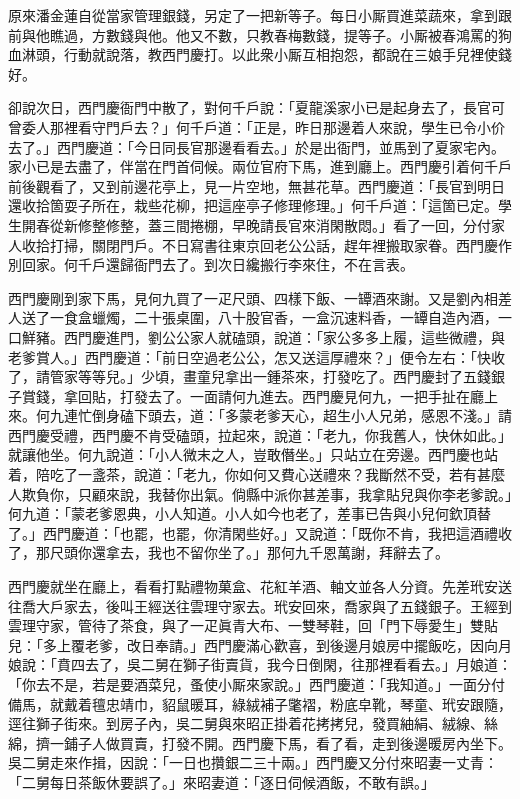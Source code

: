 原來潘金蓮自從當家管理銀錢，另定了一把新等子。每日小厮買進菜蔬來，拿到跟前與他瞧過，方數錢與他。{}他又不數，只教春梅數錢，提等子。小厮被春鴻罵的狗血淋頭，行動就說落，教西門慶打。以此衆小厮互相抱怨，都說在三娘手兒裡使錢好。

卻說次日，西門慶衙門中散了，對何千戶說：「夏龍溪家小已是起身去了，長官可曾委人那裡看守門戶去？」何千戶道：「正是，昨日那邊着人來說，學生已令小价去了。」西門慶道：「今日同長官那邊看看去。」於是出衙門，並馬到了夏家宅內。家小已是去盡了，伴當在門首伺候。兩位官府下馬，進到廳上。西門慶引着何千戶前後觀看了，又到前邊花亭上，見一片空地，無甚花草。西門慶道：「長官到明日還收拾箇耍子所在，栽些花柳，把這座亭子修理修理。」何千戶道：「這箇已定。學生開春從新修整修整，蓋三間捲棚，早晚請長官來消閑散悶。」看了一回，分付家人收拾打掃，關閉門戶。不日寫書往東京回老公公話，趕年裡搬取家眷。西門慶作別回家。何千戶還歸衙門去了。到次日纔搬行李來住，不在言表。

西門慶剛到家下馬，見何九買了一疋尺頭、四樣下飯、一罈酒來謝。又是劉內相差人送了一食盒蠟燭，二十張桌圍，八十股官香，一盒沉速料香，一罈自造內酒，一口鮮豬。西門慶進門，劉公公家人就磕頭，說道：「家公多多上履，這些微禮，與老爹賞人。」西門慶道：「前日空過老公公，怎又送這厚禮來？」便令左右：「快收了，請管家等等兒。」少頃，畫童兒拿出一鍾茶來，打發吃了。西門慶封了五錢銀子賞錢，拿回貼，打發去了。一面請何九進去。西門慶見何九，一把手扯在廳上來。何九連忙倒身磕下頭去，道：「多蒙老爹天心，超生小人兄弟，感恩不淺。」請西門慶受禮，西門慶不肯受磕頭，拉起來，說道：「老九，你我舊人，快休如此。」就讓他坐。何九說道：「小人微末之人，豈敢僭坐。」只站立在旁邊。西門慶也站着，陪吃了一盞茶，說道：「老九，你如何又費心送禮來？我斷然不受，若有甚麼人欺負你，只顧來說，我替你出氣。倘縣中派你甚差事，我拿貼兒與你李老爹說。」何九道：「蒙老爹恩典，小人知道。小人如今也老了，差事已告與小兒何欽頂替了。」西門慶道：「也罷，也罷，你清閑些好。」又說道：「既你不肯，我把這酒禮收了，那尺頭你還拿去，我也不留你坐了。」那何九千恩萬謝，拜辭去了。

西門慶就坐在廳上，看看打點禮物菓盒、花紅羊酒、軸文並各人分資。先差玳安送往喬大戶家去，後叫王經送往雲理守家去。玳安回來，喬家與了五錢銀子。王經到雲理守家，管待了茶食，與了一疋眞青大布、一雙琴鞋，回「門下辱愛生」雙貼兒：「多上覆老爹，改日奉請。」西門慶滿心歡喜，到後邊月娘房中擺飯吃，因向月娘說：「賁四去了，吳二舅在獅子街賣貨，我今日倒閑，往那裡看看去。」月娘道：「你去不是，若是要酒菜兒，蚤使小厮來家說。」西門慶道：「我知道。」一面分付備馬，就戴着氊忠靖巾，貂鼠暖耳，綠絨補子氅褶，粉底皁靴，琴童、玳安跟隨，逕往獅子街來。到房子內，吳二舅與來昭正掛着花拷拷兒，發買紬絹、絨線、絲綿，擠一鋪子人做買賣，打發不開。西門慶下馬，看了看，走到後邊暖房內坐下。吳二舅走來作揖，因說：「一日也攢銀二三十兩。」西門慶又分付來昭妻一丈青：「二舅每日茶飯休要誤了。」來昭妻道：「逐日伺候酒飯，不敢有誤。」

